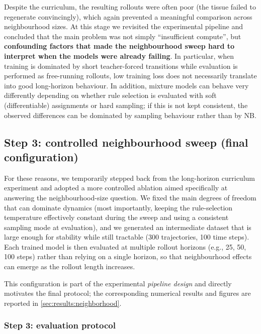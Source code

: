 Despite the curriculum, the resulting rollouts were often poor (the tissue failed to regenerate convincingly), which again prevented a meaningful comparison across neighbourhood sizes.
At this stage we revisited the experimental pipeline and concluded that the main problem was not simply ``insufficient compute'', but \textbf{confounding factors that made the neighbourhood sweep hard to interpret when the models were already failing}.
In particular, when training is dominated by short teacher-forced transitions while evaluation is performed as free-running rollouts, low training loss does not necessarily translate into good long-horizon behaviour.
In addition, mixture models can behave very differently depending on whether rule selection is evaluated with soft (differentiable) assignments or hard sampling; if this is not kept consistent, the observed differences can be dominated by sampling behaviour rather than by NB.

\subsection{Step 3: controlled neighbourhood sweep (final configuration)}

For these reasons, we temporarily stepped back from the long-horizon curriculum experiment and adopted a more controlled ablation aimed specifically at answering the neighbourhood-size question.
We fixed the main degrees of freedom that can dominate dynamics (most importantly, keeping the rule-selection temperature effectively constant during the sweep and using a consistent sampling mode at evaluation), and we generated an intermediate dataset that is large enough for stability while still tractable (300 trajectories, 100 time steps).
Each trained model is then evaluated at multiple rollout horizons (e.g., 25, 50, 100 steps) rather than relying on a single horizon, so that neighbourhood effects can emerge as the rollout length increases.

This configuration is part of the experimental \emph{pipeline design} and directly motivates the final protocol; the corresponding numerical results and figures are reported in \cref{sec:results:neighborhood}.

\subsubsection{Step 3: evaluation protocol}
\label{sec:impl:step3:results}

